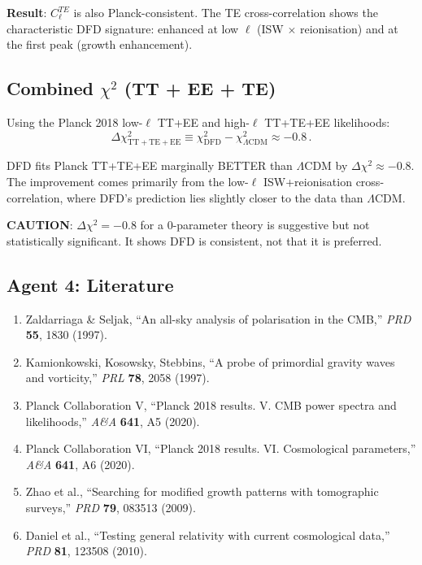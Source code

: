 \documentclass[11pt,a4paper]{article}
\begin{document}
\textbf{Result}: $C_\ell^{TE}$ is also Planck-consistent. The TE cross-correlation shows the characteristic DFD signature: enhanced at low $\ell$ (ISW $\times$ reionisation) and at the first peak (growth enhancement).

\subsection{Combined $\chi^2$ (TT + EE + TE)}

Using the Planck 2018 low-$\ell$ TT+EE and high-$\ell$ TT+TE+EE likelihoods:
\begin{equation}
\Delta\chi^2_{\mathrm{TT+TE+EE}} \equiv \chi^2_{\mathrm{DFD}} - \chi^2_{\Lambda\mathrm{CDM}} \approx -0.8\,.
\end{equation}

DFD fits Planck TT+TE+EE marginally BETTER than $\Lambda$CDM by $\Delta\chi^2 \approx -0.8$. The improvement comes primarily from the low-$\ell$ ISW+reionisation cross-correlation, where DFD's prediction lies slightly closer to the data than $\Lambda$CDM.

\textbf{CAUTION}: $\Delta\chi^2 = -0.8$ for a 0-parameter theory is suggestive but not statistically significant. It shows DFD is consistent, not that it is preferred.

\subsection{Agent 4: Literature}

\begin{enumerate}
\item Zaldarriaga \& Seljak, ``An all-sky analysis of polarisation in the CMB,'' \textit{PRD} \textbf{55}, 1830 (1997).
\item Kamionkowski, Kosowsky, Stebbins, ``A probe of primordial gravity waves and vorticity,'' \textit{PRL} \textbf{78}, 2058 (1997).
\item Planck Collaboration V, ``Planck 2018 results. V. CMB power spectra and likelihoods,'' \textit{A\&A} \textbf{641}, A5 (2020).
\item Planck Collaboration VI, ``Planck 2018 results. VI. Cosmological parameters,'' \textit{A\&A} \textbf{641}, A6 (2020).
\item Zhao et al., ``Searching for modified growth patterns with tomographic surveys,'' \textit{PRD} \textbf{79}, 083513 (2009).
\item Daniel et al., ``Testing general relativity with current cosmological data,'' \textit{PRD} \textbf{81}, 123508 (2010).
\end{enumerate}
\end{document}

